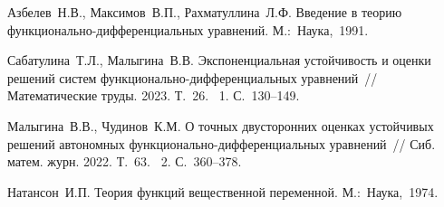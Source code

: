 
%

%

\begin{thebibliography}{9} %
 Азбелев~Н.В., Максимов~В.П., Рахматуллина~Л.Ф. Введение в теорию функ\-ци\-о\-наль\-но-дифференциальных уравнений. М.:~Наука,~1991.

 Сабатулина~Т.Л., Малыгина~В.В. Экспоненциальная устойчивость и оценки решений систем функционально-дифференциальных уравнений~// Математические труды. 2023. Т.~26. \textnumero~1. С.~130--149.

 Малыгина~В.В., Чудинов~К.М. О точных двусторонних оценках устойчивых решений автономных функционально-дифференциальных уравнений~// Сиб. матем. журн. 2022. Т.~63. \textnumero~2. С.~360--378.

 Натансон~И.П. Теория функций вещественной переменной. М.:~Наука,~1974.
\end{thebibliography}





%
